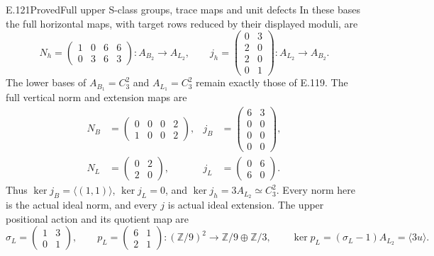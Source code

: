 \begin{statement}{E.121}{Proved}{Full upper S-class groups, trace maps and unit defects}
In these bases the full horizontal maps, with target rows reduced
by their displayed moduli, are
\[
 N_h=\begin{pmatrix}1&0&6&6\\0&3&6&3\end{pmatrix}
 :A_{B_2}\longrightarrow A_{L_2},\qquad
 j_h=\begin{pmatrix}0&3\\2&0\\2&0\\0&1\end{pmatrix}
 :A_{L_2}\longrightarrow A_{B_2}.
 \tag{E121.3}
\]
The lower bases of $A_{B_1}=C_3^2$ and $A_{L_1}=C_3^2$ remain
exactly those of E.119. The full vertical norm and extension
maps are
\[
 \begin{aligned}
 N_B&=\begin{pmatrix}0&0&0&2\\1&0&0&2\end{pmatrix},
 &j_B&=\begin{pmatrix}6&3\\0&0\\0&0\\0&0\end{pmatrix},\\
 N_L&=\begin{pmatrix}0&2\\2&0\end{pmatrix},
 &j_L&=\begin{pmatrix}0&6\\6&0\end{pmatrix}.
 \end{aligned}
 \tag{E121.4}
\]
Thus $\ker j_B=\langle(1,1)\rangle$, $\ker j_L=0$, and
$\ker j_h=3A_{L_2}\simeq C_3^2$. Every norm here is the
actual ideal norm, and every $j$ is actual ideal extension.
The upper positional action and its quotient map are
\[
 \sigma_L=\begin{pmatrix}1&3\\0&1\end{pmatrix},\qquad
 p_L=\begin{pmatrix}6&1\\2&1\end{pmatrix}
 :(\mathbb Z/9)^2\longrightarrow
        \mathbb Z/9\oplus\mathbb Z/3,\qquad
 \ker p_L=(\sigma_L-1)A_{L_2}=\langle3u\rangle.
 \tag{E121.5}
\]


\end{statement}
